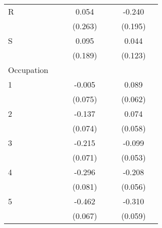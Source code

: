 \begin{longtable}{l*{3}{c}|l*{3}{c}}
		R                   &                     &                     &       0.054         &                     &                     &      -0.240         \\
		&                     &                     &     (0.263)         &                     &                     &     (0.195)         \\
		S                   &                     &                     &       0.095         &                     &                     &       0.044         \\
		&                     &                     &     (0.189)         &                     &                     &     (0.123)         \\
		Occupation &&&&&\\
		1                   &                     &                     &      -0.005         &                     &                     &       0.089         \\
		&                     &                     &     (0.075)         &                     &                     &     (0.062)         \\
		2                   &                     &                     &      -0.137         &                     &                     &       0.074         \\
		&                     &                     &     (0.074)         &                     &                     &     (0.058)         \\
		3                   &                     &                     &      -0.215\sym{**} &                     &                     &      -0.099         \\
		&                     &                     &     (0.071)         &                     &                     &     (0.053)         \\
		4                   &                     &                     &      -0.296\sym{***}&                     &                     &      -0.208\sym{***}\\
		&                     &                     &     (0.081)         &                     &                     &     (0.056)         \\
		5                   &                     &                     &      -0.462\sym{***}&                     &                     &      -0.310\sym{***}\\
		&                     &                     &     (0.067)         &                     &                     &     (0.059)         \\

\end{longtable}
